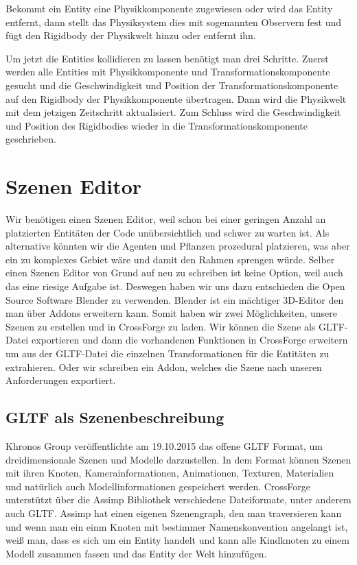 Bekommt ein Entity eine Physikkomponente zugewiesen oder wird das Entity entfernt, dann stellt das Physiksystem dies mit sogenannten Observern fest und fügt den Rigidbody der Physikwelt hinzu oder entfernt ihn.

Um jetzt die Entities kollidieren zu lassen benötigt man drei Schritte. Zuerst werden alle Entities mit Physikkomponente und Transformationskomponente gesucht und die Geschwindigkeit und Position der Transformationskomponente auf den Rigidbody der Physikkomponente übertragen. Dann wird die Physikwelt mit dem jetzigen Zeitschritt aktualisiert. Zum Schluss wird die Geschwindigkeit und Position des Rigidbodies wieder in die Transformationskomponente geschrieben.


\section{Szenen Editor}

Wir benötigen einen Szenen Editor, weil schon bei einer geringen Anzahl an platzierten Entitäten der Code unübersichtlich und schwer zu warten ist. Als alternative könnten wir die Agenten und Pflanzen prozedural platzieren, was aber ein zu komplexes Gebiet wäre und damit den Rahmen sprengen würde. Selber einen Szenen Editor von Grund auf neu zu schreiben ist keine Option, weil auch das eine riesige Aufgabe ist. Deswegen haben wir uns dazu entschieden die Open Source Software Blender zu verwenden. Blender ist ein mächtiger 3D-Editor den man über Addons erweitern kann. Somit haben wir zwei Möglichkeiten, unsere Szenen zu erstellen und in CrossForge zu laden. Wir können die Szene als GLTF-Datei exportieren und dann die vorhandenen Funktionen in CrossForge erweitern um aus der GLTF-Datei die einzelnen Transformationen für die Entitäten zu extrahieren. Oder wir schreiben ein Addon, welches die Szene nach unseren Anforderungen exportiert.

\subsection{GLTF als Szenenbeschreibung}

Khronos Group veröffentlichte am 19.10.2015 das offene GLTF Format, um dreidimensionale Szenen und Modelle darzustellen. In dem Format können Szenen mit ihren Knoten, Kamerainformationen, Animationen, Texturen, Materialien und natürlich auch Modellinformationen gespeichert werden. CrossForge unterstützt über die Assimp Bibliothek verschiedene Dateiformate, unter anderem auch GLTF. Assimp hat einen eigenen Szenengraph, den man traversieren kann und wenn man ein einm Knoten mit bestimmer Namenskonvention angelangt ist, weiß man, dass es sich um ein Entity handelt und kann alle Kindknoten zu einem Modell zusammen fassen und das Entity der Welt hinzufügen. 

